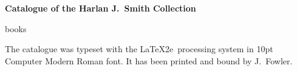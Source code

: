 \documentclass[letterpaper]{book}
\begin{document}
\printbibliography

\mainmatter
\begin{center}
  {\Large \bf Catalogue of the Harlan J.\ Smith Collection}
\end{center}
\bigskip
{books}


\backmatter

  \printindex[author]

\begin{colophon}
  The catalogue was typeset with the \LaTeX2e\ processing system in
  10pt Computer Modern Roman font. It has been printed and
  bound by J.~Fowler.
\end{colophon}
\end{document}
